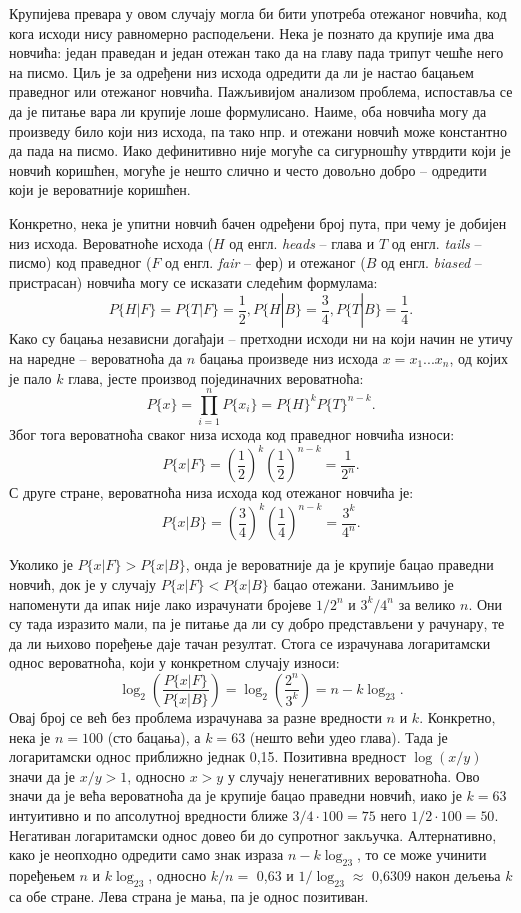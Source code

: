 \documentclass[12pt,oneside]{memoir}
\begin{document}
\begin{CJK}{UTF8}{ipxm}
Крупијева превара у овом случају могла би бити употреба отежаног новчића, код кога исходи нису равномерно расподељени. Нека је познато да крупије има два новчића: један праведан и један отежан тако да на главу пада трипут чешће него на писмо. Циљ је за одређени низ исхода одредити да ли је настао бацањем праведног или отежаног новчића. Пажљивијом анализом проблема, испоставља се да је питање вара ли крупије лоше формулисано. Наиме, оба новчића могу да произведу било који низ исхода, па тако нпр. и отежани новчић може константно да пада на писмо. Иако дефинитивно није могуће са сигурношћу утврдити који је новчић коришћен, могуће је нешто слично и често довољно добро -- одредити који је вероватније коришћен.

Конкретно, нека је упитни новчић бачен одређени број пута, при чему је добијен низ исхода. Вероватноће исхода ($H$ од енгл. \textit{heads} -- глава и $T$ од енгл. \textit{tails} -- писмо) код праведног ($F$ од енгл. \textit{fair} -- фер) и отежаног ($B$ од енгл. \textit{biased} -- пристрасан) новчића могу се исказати следећим формулама: $$P\{H | F\} = P\{T | F\} = \frac{1}{2}, P\{H | B\} = \frac{3}{4}, P\{T | B\} = \frac{1}{4}.$$ Како су бацања независни догађаји -- претходни исходи ни на који начин не утичу на наредне -- вероватноћа да $n$ бацања произведе низ исхода $x = x_1...x_n$, од којих је пало $k$ глава, јесте производ појединачних вероватноћа: $$P\{x\} = \prod_{i=1}^n P\{x_i\} = P\{H\}^k P\{T\}^{n-k}.$$ Због тога вероватноћа сваког низа исхода код праведног новчића износи: $$P\{x | F\} = \left(\frac{1}{2}\right)^k \left(\frac{1}{2}\right)^{n-k} = \frac{1}{2^n}.$$ С друге стране, вероватноћа низа исхода код отежаног новчића је: $$P\{x | B\} = \left(\frac{3}{4}\right)^k \left(\frac{1}{4}\right)^{n-k} = \frac{3^k}{4^n}.$$

Уколико је $P\{x | F\} > P\{x | B\}$, онда је вероватније да је крупије бацао праведни новчић, док је у случају $P\{x | F\} < P\{x | B\}$ бацао отежани. Занимљиво је напоменути да ипак није лако израчунати бројеве $1/2^n$ и $3^k/4^n$ за велико $n$. Они су тада изразито мали, па је питање да ли су добро представљени у рачунару, те да ли њихово поређење даје тачан резултат. Стога се израчунава логаритамски однос вероватноћа, који у конкретном случају износи: $$\log_2\left(\frac{P\{x | F\}}{P\{x | B\}}\right) = \log_2\left(\frac{2^n}{3^k}\right) = n - k\log_23.$$ Овај број се већ без проблема израчунава за разне вредности $n$ и $k$. Конкретно, нека је $n = 100$ (сто бацања), а $k = 63$ (нешто већи удео глава). Тада је логаритамски однос приближно једнак 0,15. Позитивна вредност $\log(x/y)$ значи да је $x/y > 1$, односно $x > y$ у случају ненегативних вероватноћа. Ово значи да је већа вероватноћа да је крупије бацао праведни новчић, иако је $k = 63$ интуитивно и по апсолутној вредности ближе $3/4 \cdot 100 = 75$ него $1/2 \cdot 100 = 50$. Негативан логаритамски однос довео би до супротног закључка. Алтернативно, како је неопходно одредити само знак израза $n - k\log_23$, то се може учинити поређењем $n$ и $k\log_23$, односно $k/n =$ 0,63 и $1/\log_23 \approx$ 0,6309 након дељења $k$ са обе стране. Лева страна је мања, па је однос позитиван.


\end{CJK}
\end{document}
